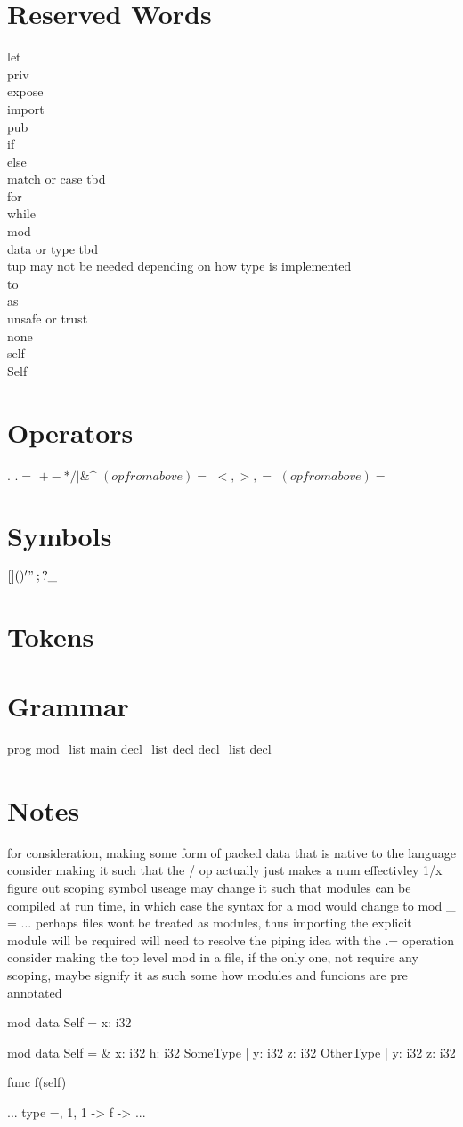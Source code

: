 \documentclass{article}
\begin{document}
	\section{Reserved Words}
		let\\
		priv\\
		expose\\
		import\\
		pub\\
		if\\
		else\\ 
		match or case tbd\\
		for\\
		while\\
		mod\\
		data or type tbd\\
		tup may not be needed depending on how type is implemented\\ 
		to\\
		as\\
		unsafe or trust\\
		none\\
		self\\
		Self\\
	\section{Operators}
		$.$
		$.=$
		$+ - * / | \& \^$
		$(op from above)=$
		$<, >, =$
		$(op from above)=$
	\section{Symbols}
		$[ ]
		( )
		{ }
		' "
		\: ;
		? \_$

	\section{Tokens}
		

	\section{Grammar}
		prog
			mod\_list main 
		decl\_list
			decl decl\_list 
		decl 

	\section{Notes}
		for consideration, making some form of packed data that is native to the language 
		consider making it such that the / op actually just makes a num effectivley 1/x
		figure out scoping symbol useage 
		may change it such that modules can be compiled at run time, in which case the syntax for a mod would change to
			mod \_ = ...
		perhaps files wont be treated as modules, thus importing the explicit module will be required 
		will need to resolve the piping idea with the .= operation
		consider making the top level mod in a file, if the only one, not require any scoping, maybe signify it as such some how 
		modules and funcions are pre annotated



		mod 
			data Self = 
				x: i32 

		mod 
			data Self = 
				\& 
					x: i32 
					h: i32
				SomeType | 
					y: i32
					z: i32
				OtherType | 
					y: i32
					z: i32

		
			func f(self)

			...
				type =, 1, 1 -> f -> ...
\end{document}
